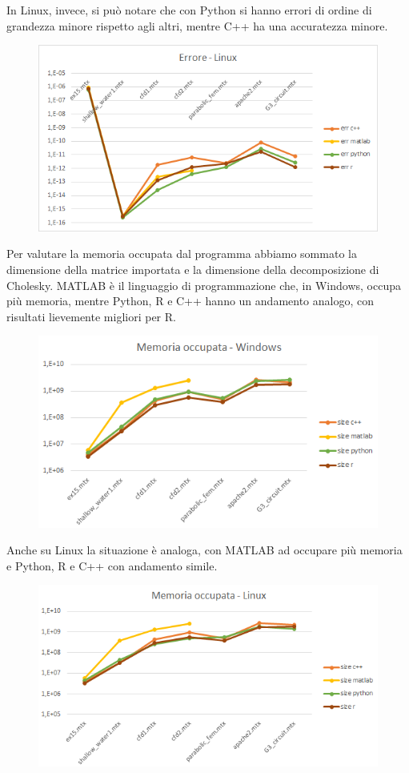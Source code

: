\documentclass[a4paper,12pt]{article}
\begin{document}
\noindent In Linux, invece, si può notare che con Python si hanno errori di ordine di grandezza minore rispetto agli altri, mentre C++ ha una accuratezza minore.
\bigskip
 
\begin{figure}[H]
\centering
  \includegraphics[width=0.75\linewidth]{img/errlinux.png}
\end{figure}

\noindent Per valutare la memoria occupata dal programma abbiamo sommato la dimensione della matrice importata e la dimensione della decomposizione di Cholesky. MATLAB è il linguaggio di programmazione che, in Windows, occupa più memoria, mentre Python, R e C++ hanno un andamento analogo, con risultati lievemente migliori per R.
\bigskip

\begin{figure}[H]
\centering
  \includegraphics[width=0.8\linewidth]{img/memoccwin.png}
\end{figure}

\noindent Anche su Linux la situazione è analoga, con MATLAB ad occupare più memoria e Python, R e C++ con andamento simile.
\bigskip

\begin{figure}[H]
\centering
  \includegraphics[width=0.8\linewidth]{img/memocclinux.png}
\end{figure}
\end{document}

